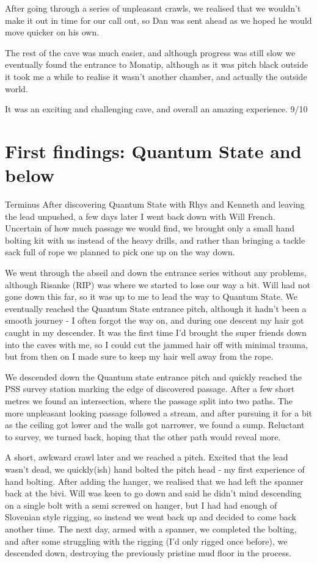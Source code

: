 After going through a series of unpleasant crawls, we realised that we wouldn't make it out in time for our call out, so Dan was sent ahead as we hoped he would move quicker on his own.

The rest of the cave was much easier, and although progress was still slow we eventually found the entrance to Monatip, although as it was pitch black outside it took me a while to realise it wasn't another chamber, and actually the outside world. 

It was an exciting and challenging cave, and overall an amazing experience. 9/10

\section{First findings: Quantum State and below}
Terminus
After discovering Quantum State with Rhys and Kenneth and leaving the lead unpushed, a few days later I went back down with Will French. 
Uncertain of how much passage we would find, we brought only a small hand bolting kit with us instead of the heavy drills, and rather than bringing a tackle sack full of rope we planned to pick one up on the way down. 

We went through the abseil and down the entrance series without any problems, although Risanke (RIP) was where we started to lose our way a bit. Will had not gone down this far, so it was up to me to lead the way to Quantum State. We eventually reached the Quantum State entrance pitch, although it hadn't been a smooth journey - I often forgot the way on, and during one descent my hair got caught in my descender. It was the first time I'd brought the super friends down into the caves with me, so I could cut the jammed hair off with minimal trauma, but from then on I made sure to keep my hair well away from the rope.

We descended down the Quantum state entrance pitch and quickly reached the PSS survey station marking the edge of discovered passage. After a few short metres we found an intersection, where the passage split into two paths. The more unpleasant looking passage followed a stream, and after pursuing it for a bit as the ceiling got lower and the walls got narrower, we found a sump. Reluctant to survey, we turned back, hoping that the other path would reveal more. 

A short, awkward crawl later and we reached a pitch. Excited that the lead wasn't dead, we quickly(ish) hand bolted the pitch head - my first experience of hand bolting. After adding the hanger, we realised that we had left the spanner back at the bivi. Will was keen to go down and said he didn't mind descending on a single bolt with a semi screwed on hanger, but I had had enough of Slovenian style rigging, so instead we went back up and decided to come back another time.
The next day, armed with a spanner, we completed the bolting, and after some struggling with the rigging (I'd only rigged once before), we descended down, destroying the previously pristine mud floor in the process. 

